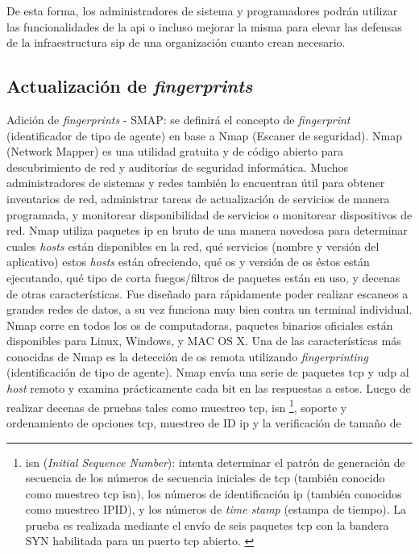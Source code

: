 \documentclass[a4paper,12pt]{report}
\begin{document}
De esta forma, los administradores de sistema y programadores podrán utilizar
las funcionalidades de la \ac{api} o incluso mejorar la misma para elevar las
defensas de la infraestructura \ac{sip} de una organización cuanto crean necesario.

\newpage

\subsection{Actualización de \emph{fingerprints}}
Adición de \emph{fingerprints} - SMAP: se definirá el concepto de \emph{fingerprint}
(identificador de tipo de agente) en base a Nmap (Escaner de seguridad). Nmap (Network
Mapper) es una utilidad gratuita y de código abierto para
descubrimiento de red y auditorías de seguridad informática. Muchos
administradores de sistemas y redes también lo encuentran útil para obtener
in\-ven\-ta\-rios de red, administrar tareas de actualización de servicios de manera
programada, y monitorear disponibilidad de servicios o monitorear dispositivos
de red. Nmap utiliza paquetes \ac{ip} en bruto de una manera novedosa para determinar
cuales \emph{hosts} están disponibles en la red, qué servicios (nombre y versión del
aplicativo) estos \emph{hosts} están ofreciendo, qué \ac{os} y versión de
\ac{os} éstos están ejecutando, qué tipo de corta fuegos/filtros de  paquetes están
en uso, y decenas de otras características. Fue diseñado para rápidamente poder
realizar escaneos a grandes redes de datos, a su vez funciona muy bien contra un
terminal individual. Nmap corre en todos los \ac{os} de
computadoras, paquetes binarios oficiales están disponibles para Linux, Windows,
y MAC OS X. 
Una de las características más conocidas de Nmap es la detección de
\ac{os} remota utilizando \emph{fingerprinting} (identificación de tipo de
agente). Nmap envía una serie de paquetes
\ac{tcp} y \ac{udp} al \emph{host} remoto y examina prácticamente cada bit en las respuestas a
estos. Luego de realizar decenas de pruebas tales como muestreo \ac{tcp}, \ac{isn}
\footnote{\ac{isn} (\emph{Initial Sequence Number}):
intenta determinar el patrón de generación de secuencia de los números de
secuencia iniciales de \ac{tcp} (también conocido como muestreo \ac{tcp} \ac{isn}), los
números de identificación \ac{ip} (también conocidos como muestreo IPID), y los
números de \emph{time stamp} (estampa de tiempo). La prueba es realizada
mediante el envío de seis paquetes \ac{tcp} con la bandera SYN habilitada para un
puerto \ac{tcp} abierto. \cite{eccouncil}}, soporte y
ordenamiento de opciones \ac{tcp}, muestreo de ID \ac{ip} y la verificación de tamaño de
\end{document}
